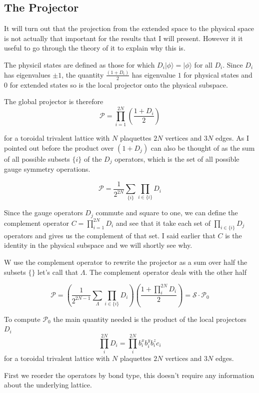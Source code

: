 \hypertarget{the-projector}{%
\subsection{The Projector}\label{the-projector}}

It will turn out that the projection from the extended space to the
physical space is not actually that important for the results that I
will present. However it it useful to go through the theory of it to
explain why this is.

The physicil states are defined as those for which
\(D_i |\phi\rangle = |\phi\rangle\) for all \(D_i\). Since \(D_i\) has
eigenvalues \(\pm1\), the quantity \(\tfrac{(1+D_i)}{2}\) has eigenvalue
\(1\) for physical states and \(0\) for extended states so is the local
projector onto the physical subspace.

The global projector is therefore
\[ \mathcal{P} = \prod_{i=1}^{2N} \left( \frac{1 + D_i}{2}\right)\]

for a toroidal trivalent lattice with \(N\) plaquettes \(2N\) vertices
and \(3N\) edges. As I pointed out before the product over \((1 + D_j)\)
can also be thought of as the sum of all possible subsets \(\{i\}\) of
the \(D_j\) operators, which is the set of all possible gauge symmetry
operations.

\[ \mathcal{P} = \frac{1}{2^{2N}} \sum_{\{i\}} \prod_{i\in\{i\}} D_i\]

Since the gauge operators \(D_j\) commute and square to one, we can
define the complement operator \(C = \prod_{i=1}^{2N} D_i\) and see that
it take each set of \(\prod_{i \in \{i\}} D_j\) operators and gives us
the complement of that set. I said earlier that \(C\) is the identity in
the physical subspace and we will shortly see why.

W use the complement operator to rewrite the projector as a sum over
half the subsets \(\{\}\) let's call that \(\Lambda\). The complement
operator deals with the other half

\[ \mathcal{P} =  \left( \frac{1}{2^{2N-1}} \sum_{\Lambda} \prod_{i\in\{i\}} D_i\right) \left(\frac{1 + \prod_i^{2N} D_i}{2}\right) = \mathcal{S} \cdot \mathcal{P}_0\]

To compute \(\mathcal{P}_0\) the main quantity needed is the product of
the local projectors \(D_i\)
\[\prod_i^{2N} D_i = \prod_i^{2N} b^x_i b^y_i b^z_i c_i \] for a
toroidal trivalent lattice with \(N\) plaquettes \(2N\) vertices and
\(3N\) edges.

First we reorder the operators by bond type, this doesn't require any
information about the underlying lattice.

